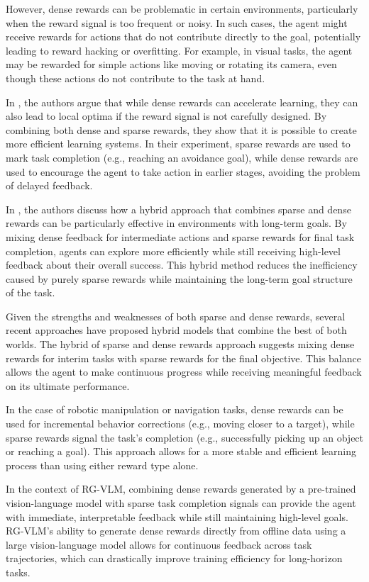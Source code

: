 \documentclass[master,english,final]{kaist-ucs}
\begin{document}
However, dense rewards can be problematic in certain environments, particularly when the reward signal is too frequent or noisy. In such cases, the agent might receive rewards for actions that do not contribute directly to the goal, potentially leading to reward hacking or overfitting. For example, in visual tasks, the agent may be rewarded for simple actions like moving or rotating its camera, even though these actions do not contribute to the task at hand.

In \cite{silveira2024combining}, the authors argue that while dense rewards can accelerate learning, they can also lead to local optima if the reward signal is not carefully designed. By combining both dense and sparse rewards, they show that it is possible to create more efficient learning systems. In their experiment, sparse rewards are used to mark task completion (e.g., reaching an avoidance goal), while dense rewards are used to encourage the agent to take action in earlier stages, avoiding the problem of delayed feedback.

In \cite{tao2025hybrid}, the authors discuss how a hybrid approach that combines sparse and dense rewards can be particularly effective in environments with long-term goals. By mixing dense feedback for intermediate actions and sparse rewards for final task completion, agents can explore more efficiently while still receiving high-level feedback about their overall success. This hybrid method reduces the inefficiency caused by purely sparse rewards while maintaining the long-term goal structure of the task.

Given the strengths and weaknesses of both sparse and dense rewards, several recent approaches have proposed hybrid models that combine the best of both worlds. The hybrid of sparse and dense rewards approach \cite{tao2025hybrid} suggests mixing dense rewards for interim tasks with sparse rewards for the final objective. This balance allows the agent to make continuous progress while receiving meaningful feedback on its ultimate performance.

In the case of robotic manipulation or navigation tasks, dense rewards can be used for incremental behavior corrections (e.g., moving closer to a target), while sparse rewards signal the task's completion (e.g., successfully picking up an object or reaching a goal). This approach allows for a more stable and efficient learning process than using either reward type alone.

In the context of RG-VLM, combining dense rewards generated by a pre-trained vision-language model with sparse task completion signals can provide the agent with immediate, interpretable feedback while still maintaining high-level goals. RG-VLM’s ability to generate dense rewards directly from offline data using a large vision-language model allows for continuous feedback across task trajectories, which can drastically improve training efficiency for long-horizon tasks.
\end{document}
